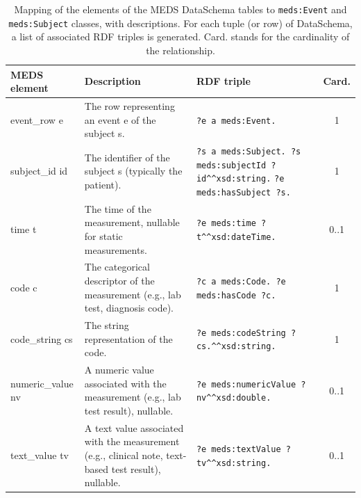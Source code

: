 \begin{table}[htbp]
	\centering
	\caption{Mapping of the elements of the MEDS DataSchema tables to \texttt{meds:Event} and \texttt{meds:Subject} classes, with descriptions. For each tuple (or row) of DataSchema, a list of associated RDF triples is generated. Card. stands for the cardinality of the relationship.}
	\label{tab:paper3_events}
\begin{tabularx}{\textwidth}{l >{\raggedright\arraybackslash}X >{\raggedright\arraybackslash}X c}		\toprule
		\textbf{MEDS element} & \textbf{Description} & \textbf{RDF triple} & \textbf{Card.} \\
		\midrule
		event\_row e & The row representing an event e of the subject s. & \texttt{?e a meds:Event.}  & 1 \\
		subject\_id id& The identifier of the subject s (typically the patient). & \texttt{?s a meds:Subject. \break ?s meds:subjectId ?id}\texttt{\string^\string^}\texttt{xsd:string.} \break \texttt{?e meds:hasSubject ?s.} & 1 \\
		time t& The time of the measurement, nullable for static measurements. & \texttt{?e meds:time ?t}\texttt{\string^\string^}\texttt{xsd:dateTime.} & 0..1 \\
		code c & The categorical descriptor of the measurement (e.g., lab test, diagnosis code). & \texttt{?c a meds:Code. \break ?e meds:hasCode ?c.} & 1 \\
		code\_string cs& The string representation of the code. & \texttt{?e meds:codeString ?cs.}\texttt{\string^\string^}\texttt{xsd:string.} & 1 \\
		numeric\_value nv & A numeric value associated with the measurement (e.g., lab test result), nullable. & \texttt{?e meds:numericValue ?nv}\texttt{\string^\string^}\texttt{xsd:double.} & 0..1 \\
		text\_value tv & A text value associated with the measurement (e.g., clinical note, text-based test result), nullable. & \texttt{?e meds:textValue ?tv}\texttt{\string^\string^}\texttt{xsd:string.} & 0..1 \\
		\bottomrule
\end{tabularx}
\end{table}
%
